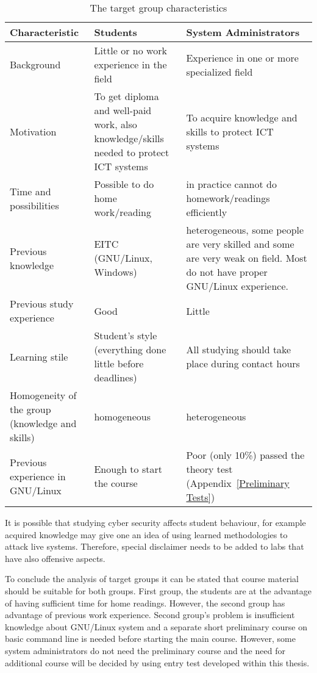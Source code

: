 \begin{table}[h]
\centering
\caption{The target group characteristics}

\begin{tabular}{|p{4cm}|p{5cm}|p{5cm}|}
\hline 
\color{blue}
Characteristic & \color{blue} Students & \color{blue} System Administrators \\ 
\hline 
Background & Little or no work experience in the field & Experience in one or more specialized field \\ 
\hline 
Motivation & To get diploma and well-paid work, also knowledge/skills needed to protect \gls{ICT} systems & To acquire  knowledge and skills to protect \gls{ICT} systems \\ 
\hline 
Time and possibilities & Possible to do home work/reading & in practice cannot do homework/readings efficiently  \\ 
\hline 
Previous knowledge &  \gls{EITC} (GNU/Linux, Windows)  &  heterogeneous, some people are very skilled and some are very weak on field. Most  do not have proper GNU/Linux experience.  \\ 
\hline 
Previous study experience & Good & Little \\ 
\hline 
Learning stile & Student's style (everything done little before deadlines) & All studying should take place during contact hours  \\ 
\hline 
Homogeneity of the group (knowledge and skills) & homogeneous & heterogeneous \\ 
\hline 
Previous experience in GNU/Linux & Enough to start the course & Poor (only 10\%) passed the theory test (Appendix~\ref{Preliminary Tests})  \\ 
\hline 
\end{tabular} 

\label{tab:targetgroup}
\end{table}
 
It  is possible that studying cyber security affects student behaviour, for example acquired knowledge may give one an idea of using learned methodologies to attack live systems. Therefore, special disclaimer needs to be added to labs that have also offensive aspects.
 
To conclude the analysis of target groups it can be stated that course material should be suitable for both groups. First group, the students are at the advantage of having sufficient time for home readings. However, the second group has advantage of previous work experience. Second group's problem is insufficient knowledge about GNU/Linux system and a separate short preliminary course on basic command line is needed before starting the main course. However, some system administrators do not need the preliminary course and the need for additional course will be decided by using entry test developed within this thesis.


